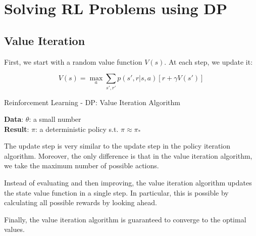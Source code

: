 \chapter{Solving RL Problems using DP \cite{baeldung/cs/ml-value-iteration-vs-policy-iteration}}

\section{Value Iteration \cite{baeldung/cs/ml-value-iteration-vs-policy-iteration}}

First, we start with a random value function $V(s)$. At each step, we update it:

\[
    V(s) = \max_{a} \sum_{s',r'}p(s', r|s,a)[r+\gamma V(s')]
\]

\begin{algorithm}[H]
    \caption{Reinforcement Learning - DP: Value Iteration Algorithm}
    
    \textbf{Data}: $\theta$: a small number\\
    \textbf{Result}: $\pi$: a deterministic policy s.t. $\pi \approx \pi_*$\\

\end{algorithm}

The update step is very similar to the update step in the policy iteration algorithm. Moreover, the only difference is that in the value iteration algorithm, we take the maximum number of possible actions.

Instead of evaluating and then improving, the value iteration algorithm updates the state value function in a single step. In particular, this is possible by calculating all possible rewards by looking ahead.

Finally, the value iteration algorithm is guaranteed to converge to the optimal values.




